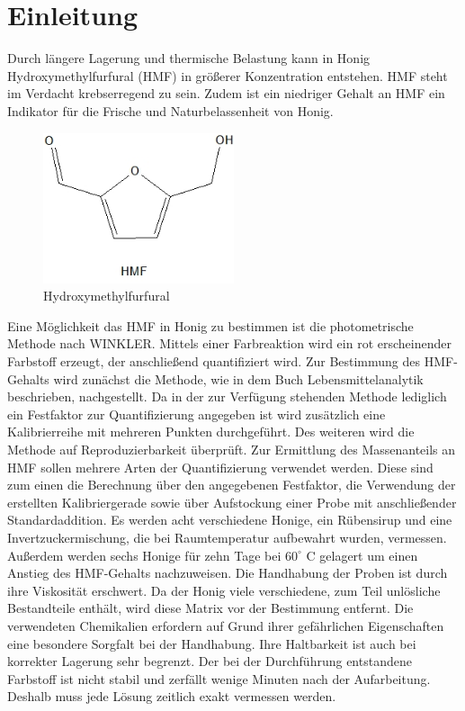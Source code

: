 \chapter{Einleitung} 

Durch längere Lagerung und thermische Belastung kann in Honig Hydroxymethylfurfural (HMF) in größerer Konzentration entstehen. HMF steht im Verdacht krebserregend zu sein. Zudem ist ein niedriger Gehalt an HMF ein Indikator für die Frische und Naturbelassenheit von Honig.
\begin{figure}[htbp]
	\centering
		\includegraphics[width=0.5\textwidth]{../Bilder/HMF.jpg}
	\caption{Hydroxymethylfurfural}
	\label{fig:HMF}
\end{figure}
\newline
Eine Möglichkeit das HMF in Honig zu bestimmen ist die photometrische Methode nach WINKLER. Mittels einer Farbreaktion wird ein rot erscheinender Farbstoff erzeugt, der anschließend quantifiziert wird. Zur  Bestimmung des HMF-Gehalts wird zunächst die Methode, wie in dem Buch Lebensmittelanalytik~\cite{Lebensmittelanalytik} beschrieben, nachgestellt. Da in der zur Verfügung stehenden Methode lediglich ein Festfaktor zur Quantifizierung angegeben ist wird zusätzlich eine Kalibrierreihe mit mehreren Punkten durchgeführt. Des weiteren wird die Methode auf Reproduzierbarkeit überprüft. Zur Ermittlung des Massenanteils an HMF sollen mehrere Arten der Quantifizierung verwendet werden. Diese sind zum einen die Berechnung über den angegebenen Festfaktor, die Verwendung der erstellten Kalibriergerade sowie über Aufstockung einer Probe mit anschließender Standardaddition. Es werden acht verschiedene Honige, ein Rübensirup und eine Invertzuckermischung, die bei Raumtemperatur aufbewahrt wurden, vermessen. Außerdem werden sechs Honige für zehn Tage bei $60^\circ$ C gelagert um einen Anstieg des HMF-Gehalts nachzuweisen. Die Handhabung der Proben ist durch ihre Viskosität erschwert. Da der Honig viele verschiedene, zum Teil unlösliche Bestandteile enthält, wird diese Matrix vor der Bestimmung entfernt. Die verwendeten Chemikalien erfordern auf Grund ihrer gefährlichen Eigenschaften eine besondere Sorgfalt bei der Handhabung. Ihre Haltbarkeit ist auch bei korrekter Lagerung sehr begrenzt. Der bei der Durchführung entstandene Farbstoff ist nicht stabil und zerfällt wenige Minuten nach der Aufarbeitung. Deshalb muss jede Lösung zeitlich exakt vermessen werden.~\cite{Winkler}